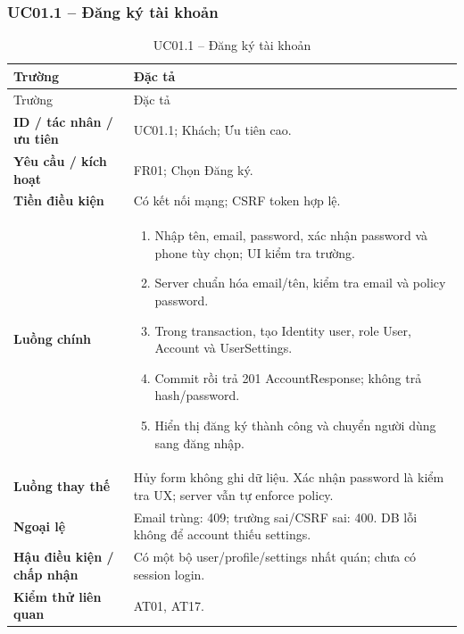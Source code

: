 \subsubsection{UC01.1 -- Đăng ký tài khoản}\label{uc:UC01.1}
\begin{smalltable}\begin{longtable}{L{3.2cm}L{11.8cm}}
\caption{UC01.1 -- Đăng ký tài khoản}\label{tab:UC01.1}\\
\toprule Trường & Đặc tả\\\midrule\endfirsthead
\toprule Trường & Đặc tả\\\midrule\endhead
\textbf{ID / tác nhân / ưu tiên} & UC01.1; Khách; Ưu tiên cao.\\
\textbf{Yêu cầu / kích hoạt} & FR01; Chọn Đăng ký.\\
\textbf{Tiền điều kiện} & Có kết nối mạng; CSRF token hợp lệ.\\
\textbf{Luồng chính} & \begin{enumerate}[leftmargin=*,nosep]
\item Nhập tên, email, password, xác nhận password và phone tùy chọn; UI kiểm tra trường.
\item Server chuẩn hóa email/tên, kiểm tra email và policy password.
\item Trong transaction, tạo Identity user, role User, Account và UserSettings.
\item Commit rồi trả 201 AccountResponse; không trả hash/password.
\item Hiển thị đăng ký thành công và chuyển người dùng sang đăng nhập.
\end{enumerate}\\
\textbf{Luồng thay thế} & Hủy form không ghi dữ liệu. Xác nhận password là kiểm tra UX; server vẫn tự enforce policy.\\
\textbf{Ngoại lệ} & Email trùng: 409; trường sai/CSRF sai: 400. DB lỗi không để account thiếu settings.\\
\textbf{Hậu điều kiện / chấp nhận} & Có một bộ user/profile/settings nhất quán; chưa có session login.\\
\textbf{Kiểm thử liên quan} & AT01, AT17.\\
\bottomrule\end{longtable}\end{smalltable}
